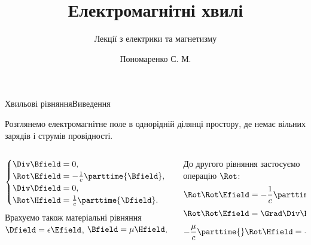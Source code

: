 \documentclass[onlytextwidth]{beamer}
\title[Лекції електрики та магнетизму]{\huge\bfseries Електромагнітні хвилі}
\subtitle{Лекції з електрики та магнетизму}
\author{Пономаренко С. М.}
\date{}
\begin{document}
\begin{frame}[plain]
	\maketitle
\end{frame}

\begin{frame}{Хвильові рівняння}{Виведення}\small
	\begin{block}{}\justifying
		Розглянемо електромагнітне поле в однорідній ділянці простору, де немає вільних зарядів і струмів провідності.
	\end{block}
	\begin{columns}
		\begin{column}{0.45\linewidth}
			\begin{block}{}\justifying
				\begin{equation*}
					\begin{cases}
						\Div\Bfield = 0,                          \\
						\Rot\Efield = -\frac1c\parttime{\Bfield}, \\
						\Div\Dfield = 0,                          \\
						\Rot\Hfield = \frac1c\parttime{\Dfield}.
					\end{cases}
				\end{equation*}
				Врахуємо також матеріальні рівняння $\Dfield = \epsilon\Efield$, $\Bfield = \mu\Hfield$.
			\end{block}
		\end{column}
		\quad
		\begin{column}{0.55\linewidth}
			\begin{overprint}
				\begin{block}{}
					До другого рівняння застосуємо операцію $\Rot$:
					\begin{equation*}
						\Rot\Rot\Efield = - \frac1c \parttime{} \Rot\Bfield.
					\end{equation*}
					\begin{equation*}
						\Rot\Rot\Efield =\Grad\Div\Efield - \nabla^2\Efield.
					\end{equation*}
					\begin{equation*}
						- \frac{\mu}c \parttime{}\Rot\Hfield = - \frac{\epsilon\mu}{c^2}\pparttime{\Efield}  .
					\end{equation*}
				\end{block}

\end{overprint}
\end{column}
\end{columns}
\end{frame}
\end{document}
